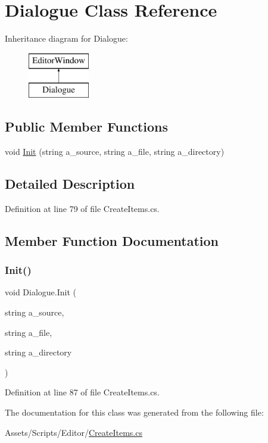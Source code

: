 \hypertarget{class_dialogue}{}\section{Dialogue Class Reference}
\label{class_dialogue}
Inheritance diagram for Dialogue\+:\begin{figure}[H]
\begin{center}
\leavevmode
\includegraphics[height=2.000000cm]{class_dialogue}
\end{center}
\end{figure}
\subsection*{Public Member Functions}
\begin{DoxyCompactItemize}
\item 
void \mbox{\hyperlink{class_dialogue_a8c865962796688b5e236b2684205313d}{Init}} (string a\+\_\+source, string a\+\_\+file, string a\+\_\+directory)
\end{DoxyCompactItemize}


\subsection{Detailed Description}


Definition at line 79 of file Create\+Items.\+cs.



\subsection{Member Function Documentation}
\mbox{\label{class_dialogue_a8c865962796688b5e236b2684205313d}} 
\subsubsection{\texorpdfstring{Init()}{Init()}}
{\footnotesize\ttfamily void Dialogue.\+Init (\begin{DoxyParamCaption}\item[{string}]{a\+\_\+source,  }\item[{string}]{a\+\_\+file,  }\item[{string}]{a\+\_\+directory }\end{DoxyParamCaption})}



Definition at line 87 of file Create\+Items.\+cs.



The documentation for this class was generated from the following file\+:\begin{DoxyCompactItemize}
\item 
Assets/\+Scripts/\+Editor/\mbox{\hyperlink{_create_items_8cs}{Create\+Items.\+cs}}\end{DoxyCompactItemize}

